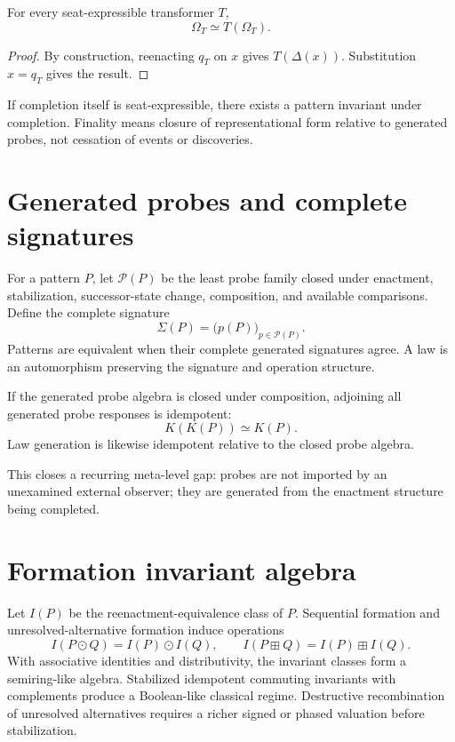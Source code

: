 \documentclass[11pt,a4paper]{article}
\begin{document}
\begin{theorem}
For every seat-expressible transformer $T$,
\begin{equation}
\Omega_T\simeq T(\Omega_T).
\end{equation}
\end{theorem}
\begin{proof}
By construction, reenacting $q_T$ on $x$ gives $T(\Delta(x))$. Substitution $x=q_T$ gives the result.
\end{proof}
If completion itself is seat-expressible, there exists a pattern invariant under completion. Finality means closure of representational form relative to generated probes, not cessation of events or discoveries.

\section{Generated probes and complete signatures}
For a pattern $P$, let $\mathcal P(P)$ be the least probe family closed under enactment, stabilization, successor-state change, composition, and available comparisons. Define the complete signature
\begin{equation}
\Sigma(P)=\bigl(p(P)\bigr)_{p\in\mathcal P(P)}.
\end{equation}
Patterns are equivalent when their complete generated signatures agree. A law is an automorphism preserving the signature and operation structure.

\begin{theorem}
If the generated probe algebra is closed under composition, adjoining all generated probe responses is idempotent:
\begin{equation}
K(K(P))\simeq K(P).
\end{equation}
Law generation is likewise idempotent relative to the closed probe algebra.
\end{theorem}
This closes a recurring meta-level gap: probes are not imported by an unexamined external observer; they are generated from the enactment structure being completed.

\section{Formation invariant algebra}
Let $I(P)$ be the reenactment-equivalence class of $P$. Sequential formation and unresolved-alternative formation induce operations
\begin{equation}
I(P\odot Q)=I(P)\odot I(Q),\qquad I(P\boxplus Q)=I(P)\boxplus I(Q).
\end{equation}
With associative identities and distributivity, the invariant classes form a semiring-like algebra. Stabilized idempotent commuting invariants with complements produce a Boolean-like classical regime. Destructive recombination of unresolved alternatives requires a richer signed or phased valuation before stabilization.
\end{document}
